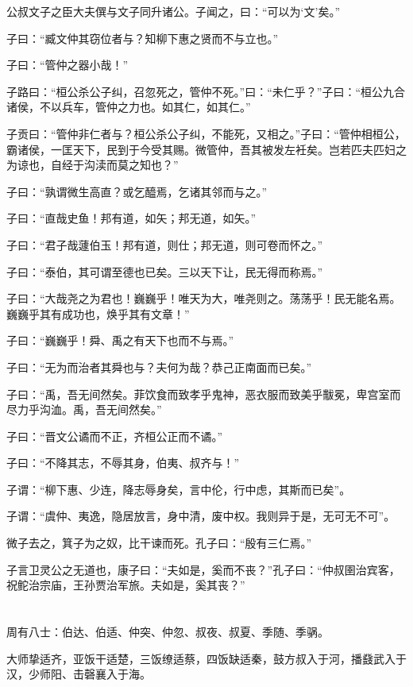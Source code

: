 \documentclass[a5paper]{ctexbook}
\begin{document}
    公叔文子之臣大夫僎与文子同升诸公。子闻之，曰：“可以为‘文’矣。”

    子曰：“臧文仲其窃位者与？知柳下惠之贤而不与立也。”

    子曰：“管仲之器小哉！”

    子路曰：“桓公杀公子纠，召忽死之，管仲不死。”曰：“未仁乎？”子曰：“桓公九合诸侯，不以兵车，管仲之力也。如其仁，如其仁。”

    子贡曰：“管仲非仁者与？桓公杀公子纠，不能死，又相之。”子曰：“管仲相桓公，霸诸侯，一匡天下，民到于今受其赐。微管仲，吾其被发左衽矣。岂若匹夫匹妇之为谅也，自经于沟渎而莫之知也？”

    子曰：“孰谓微生高直？或乞醯焉，乞诸其邻而与之。”

    子曰：“直哉史鱼！邦有道，如矢；邦无道，如矢。”

    子曰：“君子哉蘧伯玉！邦有道，则仕；邦无道，则可卷而怀之。”

    子曰：“泰伯，其可谓至德也已矣。三以天下让，民无得而称焉。”

    子曰：“大哉尧之为君也！巍巍乎！唯天为大，唯尧则之。荡荡乎！民无能名焉。巍巍乎其有成功也，焕乎其有文章！”

    子曰：“巍巍乎！舜、禹之有天下也而不与焉。”

    子曰：“无为而治者其舜也与？夫何为哉？恭己正南面而已矣。”

    子曰：“禹，吾无间然矣。菲饮食而致孝乎鬼神，恶衣服而致美乎黻冕，卑宫室而尽力乎沟洫。禹，吾无间然矣。”

    子曰：“晋文公谲而不正，齐桓公正而不谲。”

    子曰：“不降其志，不辱其身，伯夷、叔齐与！” 
    
    子谓：“柳下惠、少连，降志辱身矣，言中伦，行中虑，其斯而已矣”。
    
    子谓：“虞仲、夷逸，隐居放言，身中清，废中权。我则异于是，无可无不可”。

    微子去之，箕子为之奴，比干谏而死。孔子曰：“殷有三仁焉。”

    子言卫灵公之无道也，康子曰：“夫如是，奚而不丧？”孔子曰：“仲叔圉治宾客，祝𬶍治宗庙，王孙贾治军旅。夫如是，奚其丧？”

    \chapter{}

    周有八士：伯达、伯适、仲突、仲忽、叔夜、叔夏、季随、季䯄。

    大师挚适齐，亚饭干适楚，三饭缭适蔡，四饭缺适秦，鼓方叔入于河，播鼗武入于汉，少师阳、击磬襄入于海。
\end{document}
